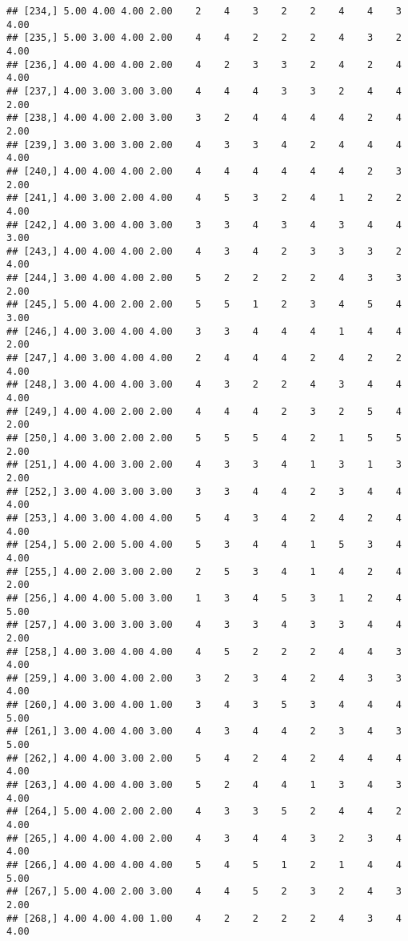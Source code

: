 \documentclass[]{article}
\begin{document}
\begin{verbatim}
## [234,] 5.00 4.00 4.00 2.00    2    4    3    2    2    4    4    3 4.00
## [235,] 5.00 3.00 4.00 2.00    4    4    2    2    2    4    3    2 4.00
## [236,] 4.00 4.00 4.00 2.00    4    2    3    3    2    4    2    4 4.00
## [237,] 4.00 3.00 3.00 3.00    4    4    4    3    3    2    4    4 2.00
## [238,] 4.00 4.00 2.00 3.00    3    2    4    4    4    4    2    4 2.00
## [239,] 3.00 3.00 3.00 2.00    4    3    3    4    2    4    4    4 4.00
## [240,] 4.00 4.00 4.00 2.00    4    4    4    4    4    4    2    3 2.00
## [241,] 4.00 3.00 2.00 4.00    4    5    3    2    4    1    2    2 4.00
## [242,] 4.00 3.00 4.00 3.00    3    3    4    3    4    3    4    4 3.00
## [243,] 4.00 4.00 4.00 2.00    4    3    4    2    3    3    3    2 4.00
## [244,] 3.00 4.00 4.00 2.00    5    2    2    2    2    4    3    3 2.00
## [245,] 5.00 4.00 2.00 2.00    5    5    1    2    3    4    5    4 3.00
## [246,] 4.00 3.00 4.00 4.00    3    3    4    4    4    1    4    4 2.00
## [247,] 4.00 3.00 4.00 4.00    2    4    4    4    2    4    2    2 4.00
## [248,] 3.00 4.00 4.00 3.00    4    3    2    2    4    3    4    4 4.00
## [249,] 4.00 4.00 2.00 2.00    4    4    4    2    3    2    5    4 2.00
## [250,] 4.00 3.00 2.00 2.00    5    5    5    4    2    1    5    5 2.00
## [251,] 4.00 4.00 3.00 2.00    4    3    3    4    1    3    1    3 2.00
## [252,] 3.00 4.00 3.00 3.00    3    3    4    4    2    3    4    4 4.00
## [253,] 4.00 3.00 4.00 4.00    5    4    3    4    2    4    2    4 4.00
## [254,] 5.00 2.00 5.00 4.00    5    3    4    4    1    5    3    4 4.00
## [255,] 4.00 2.00 3.00 2.00    2    5    3    4    1    4    2    4 2.00
## [256,] 4.00 4.00 5.00 3.00    1    3    4    5    3    1    2    4 5.00
## [257,] 4.00 3.00 3.00 3.00    4    3    3    4    3    3    4    4 2.00
## [258,] 4.00 3.00 4.00 4.00    4    5    2    2    2    4    4    3 4.00
## [259,] 4.00 3.00 4.00 2.00    3    2    3    4    2    4    3    3 4.00
## [260,] 4.00 3.00 4.00 1.00    3    4    3    5    3    4    4    4 5.00
## [261,] 3.00 4.00 4.00 3.00    4    3    4    4    2    3    4    3 5.00
## [262,] 4.00 4.00 3.00 2.00    5    4    2    4    2    4    4    4 4.00
## [263,] 4.00 4.00 4.00 3.00    5    2    4    4    1    3    4    3 4.00
## [264,] 5.00 4.00 2.00 2.00    4    3    3    5    2    4    4    2 4.00
## [265,] 4.00 4.00 4.00 2.00    4    3    4    4    3    2    3    4 4.00
## [266,] 4.00 4.00 4.00 4.00    5    4    5    1    2    1    4    4 5.00
## [267,] 5.00 4.00 2.00 3.00    4    4    5    2    3    2    4    3 2.00
## [268,] 4.00 4.00 4.00 1.00    4    2    2    2    2    4    3    4 4.00

\end{verbatim}
\end{document}
